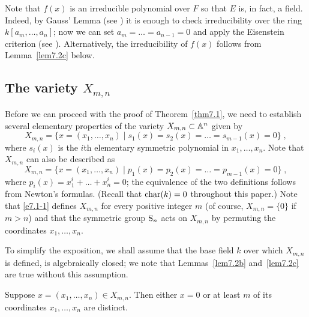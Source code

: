 Note that $f(x)$ is an irreducible polynomial over $F$ so that $E$ is,
in fact, a field. Indeed, by Gauss' Lemma (see \cite[V.6]{lang}) 
it is enough to check irreducibility over the ring 
$k[a_m, \dots, a_n]$; now we can set $a_m = \dots = a_{n-1}=0$ and 
apply the Eisenstein criterion (see \cite[V.7]{lang}).
Alternatively, the irreducibility of $f(x)$ follows from Lemma~\ref{lem7.2c}
below.

\subsection*{The variety $X_{m,n}$}

Before we can proceed with the proof of Theorem~\ref{thm7.1}, we need
to establish several elementary properties of the variety 
$X_{m, n} \subset {\Bbb A}^n$ given by
\begin{equation} \label{e7.1}
X_{m, n} = \{ x = (x_1, \ldots, x_n) \mid s_1(x) = s_2(x) = \dots = 
s_{m-1}(x) = 0 \} \; , 
\end{equation}
where $s_i(x)$ is the $i$th elementary symmetric polynomial 
in $x_1, \ldots, x_n$. Note that $X_{m, n}$ can also be described as
\begin{equation} \label{e7.1-1}
X_{m, n} = \{ x = (x_1, \ldots, x_n) \mid p_1(x) = p_2(x) = \dots = 
p_{m-1}(x) = 0 \} \; , 
\end{equation}
where $p_i(x) = x_1^i + \ldots + x_n^i = 0$; the equivalence 
of the two definitions follows from Newton's formulas.
(Recall that $\operatorname{char}(k) = 0$ throughout this paper.) 
Note that \eqref{e7.1-1} defines $X_{m, n}$ for every positive integer $m$
(of course, $X_{m, n} = \{ 0 \}$ if $m > n$) and that
the symmetric group ${\operatorname{S}}_n$ acts on $X_{m, n}$ by permuting 
the coordinates $x_1, \ldots, x_n$.

To simplify the exposition, we shall assume that the base field $k$ over which
$X_{m, n}$ is defined, is algebraically closed; we note that
Lemmas~\ref{lem7.2b} and~\ref{lem7.2c} are true without this assumption.

\begin{lem} \label{lem7.2a}
Suppose $x=(x_1, \ldots, x_n) \in X_{m, n}$. Then either 
$x = 0$ or at least $m$ of its coordinates $x_1, \ldots, x_n$ are distinct.
\end{lem}

